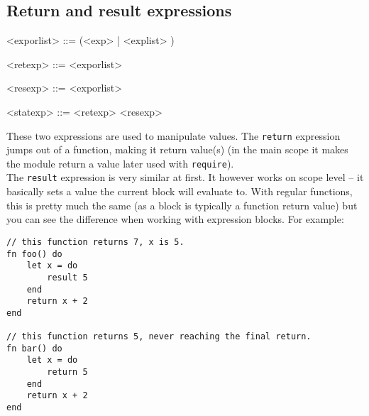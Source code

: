 \documentclass{article}
\newenvironment{bnf}
{
\begin{mdframed}
\begin{grammar}
}
{
\end{grammar}
\end{mdframed}
}
\begin{document}
\subsection{Return and result expressions}
\begin{bnf}
<exporlist> ::= (<exp> | \lit{(} <explist> \lit{)})

<retexp> ::=  <exporlist>

<resexp> ::=  <exporlist>

<statexp> ::= <retexp> <resexp>
\end{bnf}
These two expressions are used to manipulate values. The \verb|return|
expression jumps out of a function, making it return value(s) (in the main
scope it makes the module return a value later used with \verb|require|).\\
The \verb|result| expression is very similar at first. It however works on
scope level -- it basically sets a value the current block will evaluate to.
With regular functions, this is pretty much the same (as a block is typically
a function return value) but you can see the difference when working with
expression blocks. For example:
\begin{lstlisting}[language=vortex]
// this function returns 7, x is 5.
fn foo() do
    let x = do
        result 5
    end
    return x + 2
end

// this function returns 5, never reaching the final return.
fn bar() do
    let x = do
        return 5
    end
    return x + 2
end
\end{lstlisting}
\end{document}
